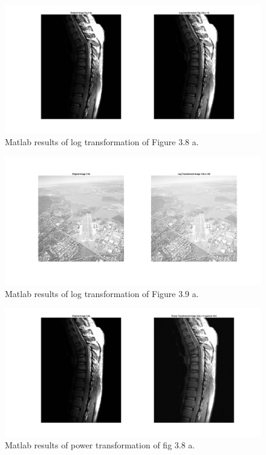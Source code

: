 \documentclass[./rarnold_report2.tex]{subfiles}
\begin{document}
\clearpage
  
  	\begin{figure}[!htbp]
	\centering
	\includegraphics[scale=0.25]{"log_spine"}
	\caption{Matlab results of log transformation of Figure 3.8 a.} 
	\label{log_spine}
	\end{figure}
	
	\begin{figure}[!htbp]
	\centering
	\includegraphics[scale=0.25]{"log_city"}
	\caption{Matlab results of log transformation of Figure 3.9 a.} 
	\label{log_city}
	\end{figure}
  

  
  	\begin{figure}[!htbp]
	\centering
	\includegraphics[scale=0.25]{"power_spine"}
	\caption{Matlab results of power transformation of fig 3.8 a.} 
	\label{power_spine}
	\end{figure}
	
\end{document}
